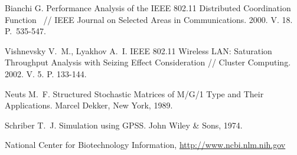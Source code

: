 \documentclass[10pt]{article}
\begin{document}
\begin{thebibliography}{99}
Bianchi G. Performance Analysis of the IEEE 802.11 Distributed
Coordination Function ~// IEEE Journal on Selected Areas in
Communications. 2000. V. 18. P.~535-547.

 Vishnevsky V.~M., Lyakhov A.~I. IEEE 802.11
    Wireless LAN: Saturation Throughput Analysis with Seizing
    Effect Consideration
// Cluster Computing. 2002. V. 5. P. 133-144.

 Neuts M.~F.  Structured Stochastic
    Matrices of M/G/1 Type and Their Applications. Marcel
    Dekker, New York, 1989.

 Schriber T.~J. Simulation using GPSS. John
    Wiley \& Sons, 1974.
    
 National Center for Biotechnology Information, \url{http://www.ncbi.nlm.nih.gov}

\end{thebibliography}
\end{document}
